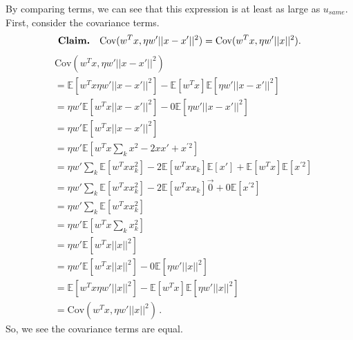 \documentclass[runningheads]{llncs}
\begin{document}
By comparing terms, we can see that this expression is at least as large as  $u_{same}$. First, consider the covariance terms. 
\[
\textbf{Claim.} \hspace{10pt} \text{Cov}(w^Tx, \eta w'||x - x'||^2) = \text{Cov}(w^Tx,\eta w'||x||^2). \\[10pt]
\]
\begin{align*}
    &\text{Cov}(w^Tx, \eta w'||x - x'||^2)  \\
    &=\mathbb{E}[w^Tx\eta w'||x-x'||^2] - \mathbb{E}[w^Tx]\mathbb{E}[\eta w'||x - x'||^2] \\
    &= \eta w'\mathbb{E}[w^Tx||x-x'||^2] - 0\mathbb{E}[\eta w'||x - x'||^2]\\
    &= \eta w'\mathbb{E}[w^Tx||x-x'||^2] \\
    &= \eta w'\mathbb{E}[w^Tx\sum_{k}x^2 - 2xx' + x^{'2}] \\
    &= \eta w'\sum_{k}\mathbb{E}[w^Txx_k^2] - 2\mathbb{E}[w^Txx_k]\mathbb{E}[x'] + \mathbb{E}[w^Tx]\mathbb{E}[x^{'2}] \\
    &= \eta w'\sum_{k}\mathbb{E}[w^Txx_k^2] - 2\mathbb{E}[w^Txx_k]\vec{0} + 0\mathbb{E}[x^{'2}] \\
    &= \eta w'\sum_{k}\mathbb{E}[w^Txx_k^2] \\
    &= \eta w'\mathbb{E}[w^Tx\sum_{k}x_k^2] \\
    &= \eta w'\mathbb{E}[w^Tx||x||^2] \\
    &= \eta w'\mathbb{E}[w^Tx||x||^2] - 0\mathbb{E}[\eta w'||x||^2] \\
        &= \mathbb{E}[w^Tx\eta w'||x||^2] - \mathbb{E}[w^Tx]\mathbb{E}[\eta w'||x||^2] \\
    &= \text{Cov}(w^Tx,\eta w'||x||^2)  \,.
\end{align*}
So, we see the covariance terms are equal. 
\end{document}
